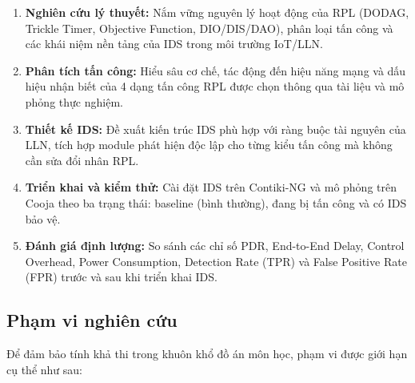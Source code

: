 \begin{enumerate}
    \item[\textbf{M1.}] \textbf{Nghiên cứu lý thuyết:} Nắm vững nguyên
          lý hoạt động của RPL (DODAG, Trickle Timer, Objective Function,
          DIO/DIS/DAO), phân loại tấn công và các khái niệm nền tảng của
          IDS trong môi trường IoT/LLN.

    \item[\textbf{M2.}] \textbf{Phân tích tấn công:} Hiểu sâu cơ chế,
          tác động đến hiệu năng mạng và dấu hiệu nhận biết của 4 dạng
          tấn công RPL được chọn thông qua tài liệu và mô phỏng thực nghiệm.

    \item[\textbf{M3.}] \textbf{Thiết kế IDS:} Đề xuất kiến trúc IDS phù
          hợp với ràng buộc tài nguyên của LLN, tích hợp module phát hiện
          độc lập cho từng kiểu tấn công mà không cần sửa đổi nhân RPL.

    \item[\textbf{M4.}] \textbf{Triển khai và kiểm thử:} Cài đặt IDS
          trên Contiki-NG và mô phỏng trên Cooja theo ba trạng thái:
          baseline (bình thường), đang bị tấn công và có IDS bảo vệ.

    \item[\textbf{M5.}] \textbf{Đánh giá định lượng:} So sánh các chỉ số
          PDR, End-to-End Delay, Control Overhead, Power Consumption,
          Detection Rate (TPR) và False Positive Rate (FPR) trước và sau
          khi triển khai IDS.
\end{enumerate}

\subsection{Phạm vi nghiên cứu}
\label{subsec:scope}

Để đảm bảo tính khả thi trong khuôn khổ đồ án môn học, phạm vi được giới
hạn cụ thể như sau:

